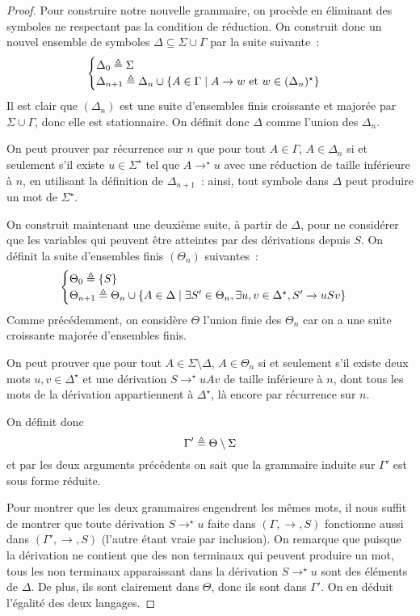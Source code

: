 \begin{proof}
  Pour construire notre nouvelle grammaire, on procède en éliminant des
  symboles ne respectant pas la condition de réduction. On construit donc un
  nouvel ensemble de symboles $\Delta \subseteq \Sigma\cup\Gamma$ par la suite
  suivante~:
  \[\begin{cases}
  \Delta_0 \triangleq \Sigma \\
  \Delta_{n+1} \triangleq \Delta_n \cup \{A \in \Gamma\mid A \to w \text{ et }
  w \in(\Delta_n)^\star\}
  \end{cases}\]
  Il est clair que $(\Delta_n)$ est une suite d'ensembles finis croissante et
  majorée par $\Sigma\cup \Gamma$, donc elle est stationnaire. On définit donc
  $\Delta$ comme l'union des $\Delta_n$.

  On peut prouver par récurrence sur $n$ que pour tout $A \in \Gamma$,
  $A \in \Delta_n$ si et seulement s'il existe $u \in \Sigma^\star$ tel que
  $A \to^\star u$ avec une réduction de taille inférieure à $n$, en utilisant la
  définition de $\Delta_{n+1}$~: ainsi, tout symbole dans $\Delta$ peut produire
  un mot de $\Sigma^\star$.

  On construit maintenant une deuxième suite, à partir de $\Delta$, pour
  ne considérer que les variables qui peuvent être atteintes par des dérivations
  depuis $S$. On définit la suite d'ensembles finis $(\Theta_n)$ suivantes~:
  \[\begin{cases}
  \Theta_0 \triangleq \{S\}\\
  \Theta_{n+1} \triangleq \Theta_n \cup
  \{A \in \Delta\mid \exists S' \in \Theta_n,
  \exists u,v \in \Delta^\star, S' \to uSv\}
  \end{cases}\]
  Comme précédemment, on considère $\Theta$ l'union finie des $\Theta_n$ car on
  a une suite croissante majorée d'ensembles finis.

  On peut prouver que pour tout $A \in \Sigma\setminus\Delta$, $A \in \Theta_n$
  si et seulement s'il existe deux mots $u,v \in \Delta^\star$ et une dérivation
  $S \to^\star uAv$ de taille inférieure à $n$, dont tous les mots de la
  dérivation appartiennent à $\Delta^\star$, là encore par récurrence sur $n$.

  On définit donc
  \[\Gamma' \triangleq \Theta\setminus \Sigma\]
  et par les deux arguments précédents on sait que la grammaire induite sur
  $\Gamma'$ est sous forme réduite.

  Pour montrer que les deux grammaires engendrent les mêmes mots, il nous suffit
  de montrer que toute dérivation $S \to^\star u$ faite dans $(\Gamma,\to,S)$
  fonctionne aussi dans $(\Gamma',\to,S)$ (l'autre étant vraie par inclusion).
  On remarque que puisque la dérivation ne contient que des non terminaux qui
  peuvent produire un mot, tous les non terminaux apparaissant dans la
  dérivation $S \to^\star u$ sont des éléments de $\Delta$. De plus, ils sont
  clairement dans $\Theta$, donc ils sont dans $\Gamma'$. On en déduit l'égalité
  des deux langages.
\end{proof}

